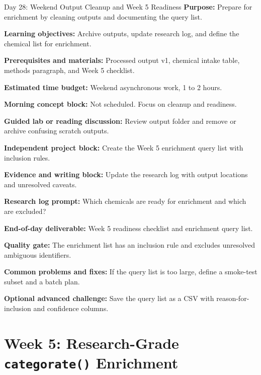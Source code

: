 \begin{dailybox}{Day 28: Weekend Output Cleanup and Week 5 Readiness}
\textbf{Purpose:} Prepare for enrichment by cleaning outputs and documenting the query list.

\textbf{Learning objectives:} Archive outputs, update research log, and define the chemical list for enrichment.

\textbf{Prerequisites and materials:} Processed output v1, chemical intake table, methods paragraph, and Week 5 checklist.

\textbf{Estimated time budget:} Weekend asynchronous work, 1 to 2 hours.

\textbf{Morning concept block:} Not scheduled. Focus on cleanup and readiness.

\textbf{Guided lab or reading discussion:} Review output folder and remove or archive confusing scratch outputs.

\textbf{Independent project block:} Create the Week 5 enrichment query list with inclusion rules.

\textbf{Evidence and writing block:} Update the research log with output locations and unresolved caveats.

\textbf{Research log prompt:} Which chemicals are ready for enrichment and which are excluded?

\textbf{End-of-day deliverable:} Week 5 readiness checklist and enrichment query list.

\textbf{Quality gate:} The enrichment list has an inclusion rule and excludes unresolved ambiguous identifiers.

\textbf{Common problems and fixes:} If the query list is too large, define a smoke-test subset and a batch plan.

\textbf{Optional advanced challenge:} Save the query list as a CSV with reason-for-inclusion and confidence columns.
\end{dailybox}

\section{Week 5: Research-Grade \texttt{categorate()} Enrichment}

